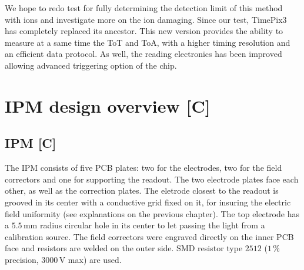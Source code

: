 \begin{refsection}
  We hope to redo test for fully determining the detection limit of this method with ions and investigate more on the ion damaging.
  Since our test, TimePix3 has completely replaced its ancestor. This new version provides the ability to measure at a same time the ToT and ToA, with a higher timing resolution and an efficient data protocol. As well, the reading electronics has been improved allowing advanced triggering option of the chip.



  \section{IPM design overview [C]}
  \subsection{IPM [C]}
  
  The IPM consists of five PCB plates: two for the electrodes, two for the field correctors and one for supporting the readout. The two electrode plates face each other, as well as the correction plates. The eletrode closest to the readout is grooved in its center with a conductive grid fixed on it, for insuring the electric field uniformity (see explanations on the previous chapter). The top electrode has a $5.5\,\mathrm{mm}$ radius circular hole in its center to let passing the light from a calibration source. The field correctors were engraved directly on the inner PCB face and resistors are welded on the outer side. SMD resistor type $2512$ ($1\,\mathrm{\%}$ precision, $3000\,\mathrm{V}$ max) are used.


\end{refsection}
